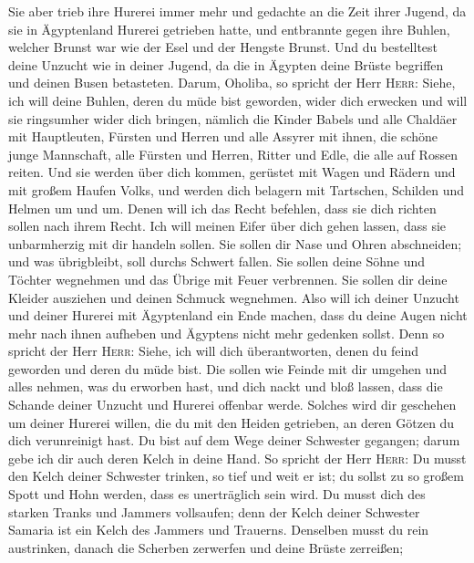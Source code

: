 Sie aber trieb ihre Hurerei immer mehr und gedachte an
die Zeit ihrer Jugend, da sie in Ägyptenland Hurerei getrieben hatte,
 und entbrannte gegen ihre Buhlen, welcher Brunst war wie
der Esel und der Hengste Brunst.  Und du bestelltest
deine Unzucht wie in deiner Jugend, da die in Ägypten deine Brüste
begriffen und deinen Busen betasteten.  Darum, Oholiba,
so spricht der Herr \textsc{Herr}: Siehe, ich will deine Buhlen, deren
du müde bist geworden, wider dich erwecken und will sie ringsumher wider
dich bringen,  nämlich die Kinder Babels und alle
Chaldäer mit Hauptleuten, Fürsten und Herren und alle Assyrer mit ihnen,
die schöne junge Mannschaft, alle Fürsten und Herren, Ritter und Edle,
die alle auf Rossen reiten.  Und sie werden über dich
kommen, gerüstet mit Wagen und Rädern und mit großem Haufen Volks, und
werden dich belagern mit Tartschen, Schilden und Helmen um und um. Denen
will ich das Recht befehlen, dass sie dich richten sollen nach ihrem
Recht.  Ich will meinen Eifer über dich gehen lassen,
dass sie unbarmherzig mit dir handeln sollen. Sie sollen dir Nase und
Ohren abschneiden; und was übrigbleibt, soll durchs Schwert fallen. Sie
sollen deine Söhne und Töchter wegnehmen und das Übrige mit Feuer
verbrennen.  Sie sollen dir deine Kleider ausziehen und
deinen Schmuck wegnehmen.  Also will ich deiner Unzucht
und deiner Hurerei mit Ägyptenland ein Ende machen, dass du deine Augen
nicht mehr nach ihnen aufheben und Ägyptens nicht mehr gedenken sollst.
 Denn so spricht der Herr \textsc{Herr}: Siehe, ich will
dich überantworten, denen du feind geworden und deren du müde bist.
 Die sollen wie Feinde mit dir umgehen und alles nehmen,
was du erworben hast, und dich nackt und bloß lassen, dass die Schande
deiner Unzucht und Hurerei offenbar werde.  Solches wird
dir geschehen um deiner Hurerei willen, die du mit den Heiden getrieben,
an deren Götzen du dich verunreinigt hast.  Du bist auf
dem Wege deiner Schwester gegangen; darum gebe ich dir auch deren Kelch
in deine Hand.  So spricht der Herr \textsc{Herr}: Du
musst den Kelch deiner Schwester trinken, so tief und weit er ist; du
sollst zu so großem Spott und Hohn werden, dass es unerträglich sein
wird.  Du musst dich des starken Tranks und Jammers
vollsaufen; denn der Kelch deiner Schwester Samaria ist ein Kelch des
Jammers und Trauerns.  Denselben musst du rein
austrinken, danach die Scherben zerwerfen und deine Brüste zerreißen;
